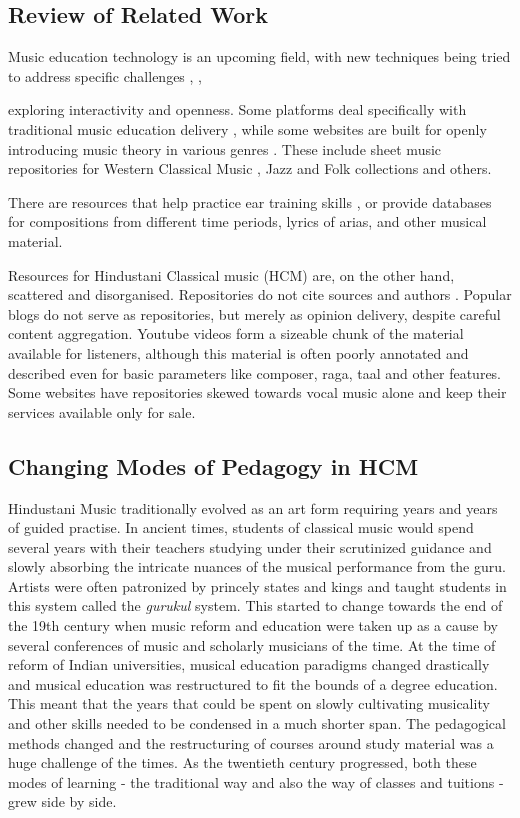 \documentclass{tufte-handout}
\begin{document}
\subsection{Review of Related Work}
Music education technology is an upcoming field, with new techniques being tried to address specific challenges \cite{wei2011investigating}, \cite{ccards}, %

exploring interactivity and openness. Some platforms deal specifically with traditional music education delivery \cite{lou2009study}, while some websites are built for openly introducing music theory in various genres \cite{openmusictheory}. These include sheet music repositories for Western Classical Music \cite{IMSLP-petrucci}, Jazz and Folk collections \cite{smithsonian} and others.  

There are resources that help practice ear training skills \cite{eartr}, or provide databases for compositions from different time periods, lyrics of arias, and other musical material.

Resources for Hindustani Classical music (HCM) are, on the other hand, scattered and disorganised.  Repositories do not cite sources and authors \cite{sra,ncpa}. Popular blogs \cite{parrikar,deepakraja} do not serve as repositories, but merely as opinion delivery, despite careful content aggregation.  Youtube videos form a sizeable chunk of the material available for listeners, although this material is often poorly annotated and described even for basic parameters like composer, raga, taal and other features.  Some websites have repositories skewed towards vocal music alone \cite{swarganga} and keep their services available only for sale.


\subsection{Changing Modes of Pedagogy in HCM}\label{sec:pedagogy}
Hindustani Music traditionally evolved as an art form requiring years and years of guided practise. In ancient times, students of classical music would spend several years with their teachers studying under their scrutinized guidance and slowly absorbing the intricate nuances of the musical performance from the guru. \cite{neuman} Artists were often patronized by princely states and kings and taught students in this system called the \textit{gurukul} system. This started to change towards the end of the 19th century when music reform and education were taken up as a cause by several conferences of music and scholarly musicians of the time.\cite{newmansions} At the time of reform of Indian universities, musical education paradigms changed drastically and musical education was restructured to fit the bounds of a degree education. This meant that the years that could be spent on slowly cultivating musicality and other skills needed to be condensed in a much shorter span. The pedagogical methods changed and the restructuring of courses around study material was a huge challenge of the times. As the twentieth century progressed, both these modes of learning - the traditional way and also the way of classes and tuitions - grew side by side.
\end{document}
